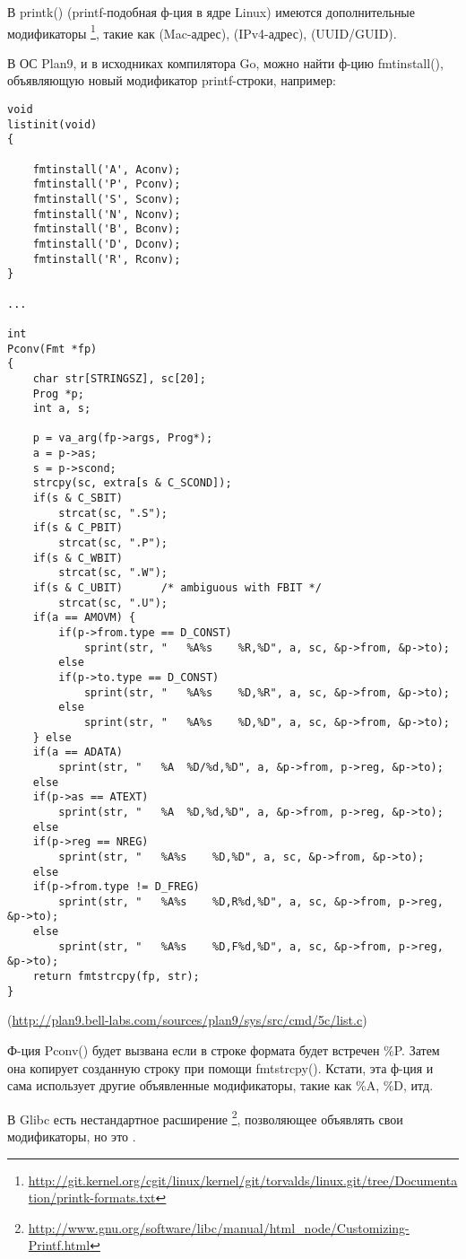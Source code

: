 В printk() (printf-подобная ф-ция в ядре Linux) имеются дополнительные модификаторы
\footnote{\url{http://git.kernel.org/cgit/linux/kernel/git/torvalds/linux.git/tree/Documentation/printk-formats.txt}}, 
такие как  (Mac-адрес),  (IPv4-адрес),  (UUID/GUID).

В ОС Plan9, и в исходниках компилятора Go, можно найти ф-цию fmtinstall(), объявляющую новый модификатор printf-строки,
например:

\begin{lstlisting}[caption=go\textbackslash{}src\textbackslash{}cmd\textbackslash{}5c\textbackslash{}list.c]
void
listinit(void)
{

	fmtinstall('A', Aconv);
	fmtinstall('P', Pconv);
	fmtinstall('S', Sconv);
	fmtinstall('N', Nconv);
	fmtinstall('B', Bconv);
	fmtinstall('D', Dconv);
	fmtinstall('R', Rconv);
}

...

int
Pconv(Fmt *fp)
{
	char str[STRINGSZ], sc[20];
	Prog *p;
	int a, s;

	p = va_arg(fp->args, Prog*);
	a = p->as;
	s = p->scond;
	strcpy(sc, extra[s & C_SCOND]);
	if(s & C_SBIT)
		strcat(sc, ".S");
	if(s & C_PBIT)
		strcat(sc, ".P");
	if(s & C_WBIT)
		strcat(sc, ".W");
	if(s & C_UBIT)		/* ambiguous with FBIT */
		strcat(sc, ".U");
	if(a == AMOVM) {
		if(p->from.type == D_CONST)
			sprint(str, "	%A%s	%R,%D", a, sc, &p->from, &p->to);
		else
		if(p->to.type == D_CONST)
			sprint(str, "	%A%s	%D,%R", a, sc, &p->from, &p->to);
		else
			sprint(str, "	%A%s	%D,%D", a, sc, &p->from, &p->to);
	} else
	if(a == ADATA)
		sprint(str, "	%A	%D/%d,%D", a, &p->from, p->reg, &p->to);
	else
	if(p->as == ATEXT)
		sprint(str, "	%A	%D,%d,%D", a, &p->from, p->reg, &p->to);
	else
	if(p->reg == NREG)
		sprint(str, "	%A%s	%D,%D", a, sc, &p->from, &p->to);
	else
	if(p->from.type != D_FREG)
		sprint(str, "	%A%s	%D,R%d,%D", a, sc, &p->from, p->reg, &p->to);
	else
		sprint(str, "	%A%s	%D,F%d,%D", a, sc, &p->from, p->reg, &p->to);
	return fmtstrcpy(fp, str);
}
\end{lstlisting}
(\url{http://plan9.bell-labs.com/sources/plan9/sys/src/cmd/5c/list.c})

Ф-ция Pconv() будет вызвана если в строке формата будет встречен \%P. Затем она копирует созданную строку
при помощи fmtstrcpy(). Кстати, эта ф-ция и сама использует другие объявленные модификаторы, такие как \%A, \%D, итд.

В Glibc есть нестандартное расширение
\footnote{\url{http://www.gnu.org/software/libc/manual/html_node/Customizing-Printf.html}}, 
позволяющее объявлять свои модификаторы, но это .

